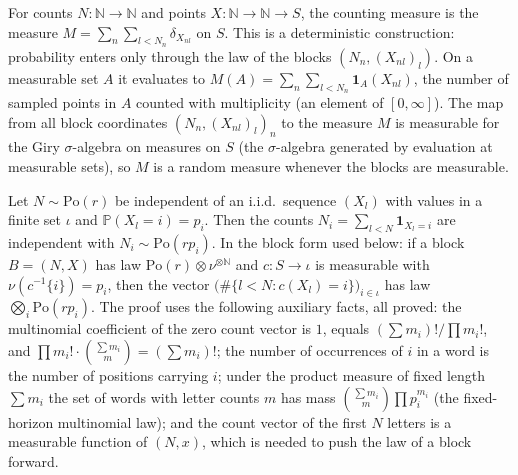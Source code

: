 \begin{definition}\label{def:sg:poisson-counting}
  \leanok
For counts $N:\mathbb N\to\mathbb N$ and points $X:\mathbb N\to\mathbb N\to S$, the counting measure is the measure $M=\sum_n\sum_{l<N_n}\delta_{X_{nl}}$ on $S$. This is a deterministic construction: probability enters only through the law of the blocks $(N_n,(X_{nl})_l)$. On a measurable set $A$ it evaluates to $M(A)=\sum_n\sum_{l<N_n}\mathbf 1_A(X_{nl})$, the number of sampled points in $A$ counted with multiplicity (an element of $[0,\infty]$). The map from all block coordinates $(N_n,(X_{nl})_l)_n$ to the measure $M$ is measurable for the Giry $\sigma$-algebra on measures on $S$ (the $\sigma$-algebra generated by evaluation at measurable sets), so $M$ is a random measure whenever the blocks are measurable.
\end{definition}

\begin{lemma}\label{lem:sg:poisson-thinning}
  \leanok
Let $N\sim\mathrm{Po}(r)$ be independent of an i.i.d.\ sequence $(X_l)$ with values in a finite set $\iota$ and $\mathbb P(X_l=i)=p_i$. Then the counts
$N_i=\sum_{l<N}\mathbf 1_{X_l=i}$ are independent with $N_i\sim\mathrm{Po}(rp_i)$. In the block form used below: if a block $B=(N,X)$ has law $\mathrm{Po}(r)\otimes\nu^{\otimes\mathbb N}$ and $c:S\to\iota$ is
measurable with $\nu(c^{-1}\{i\})=p_i$, then the vector $\big(\#\{l<N:c(X_l)=i\}\big)_{i\in\iota}$ has law $\bigotimes_i\mathrm{Po}(rp_i)$.
The proof uses the following auxiliary facts, all proved: the multinomial coefficient of the zero count vector is $1$, equals $(\sum m_i)!/\prod m_i!$, and $\prod m_i!\cdot\binom{\sum m_i}{m}=(\sum m_i)!$; the number of occurrences of $i$ in a word is the number of positions carrying $i$; under the product measure of fixed length $\sum m_i$ the set of words with letter counts $m$ has mass $\binom{\sum m_i}{m}\prod p_i^{m_i}$ (the fixed-horizon multinomial law); and the count vector of the first $N$ letters is a measurable function of $(N,x)$, which is needed to push the law of a block forward.
\end{lemma}

